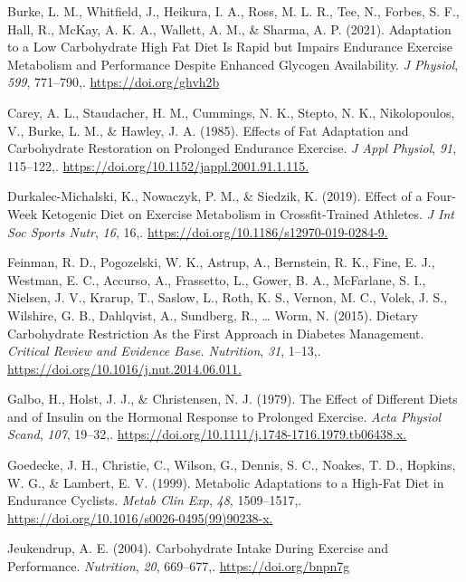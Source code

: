 \documentclass[]{cik}%
\newlength{\cslhangindent}
\newlength{\cslentryspacingunit} %
\newenvironment{CSLReferences}[2] %
 {%
  \setlength{\parindent}{0pt}
  \ifodd #1
  \let\oldpar\par
  \def\par{\hangindent=\cslhangindent\oldpar}
  \fi
  \setlength{\parskip}{#2\cslentryspacingunit}
 }%
 {}
\begin{document}
\begin{CSLReferences}{1}{0}
\leavevmode{}%
Burke, L. M., Whitfield, J., Heikura, I. A., Ross, M. L. R., Tee, N.,
Forbes, S. F., Hall, R., McKay, A. K. A., Wallett, A. M., \& Sharma, A.
P. (2021). Adaptation to a Low Carbohydrate High Fat Diet Is Rapid but
Impairs Endurance Exercise Metabolism and Performance Despite Enhanced
Glycogen Availability. \emph{J Physiol}, \emph{599}, 771--790,.
\url{https://doi.org/ghvh2b}

\leavevmode{}%
Carey, A. L., Staudacher, H. M., Cummings, N. K., Stepto, N. K.,
Nikolopoulos, V., Burke, L. M., \& Hawley, J. A. (1985). Effects of Fat
Adaptation and Carbohydrate Restoration on Prolonged Endurance Exercise.
\emph{J Appl Physiol}, \emph{91}, 115--122,.
\url{https://doi.org/10.1152/jappl.2001.91.1.115.}

\leavevmode{}%
Durkalec-Michalski, K., Nowaczyk, P. M., \& Siedzik, K. (2019). Effect
of a Four-Week Ketogenic Diet on Exercise Metabolism in Crossfit-Trained
Athletes. \emph{J Int Soc Sports Nutr}, \emph{16}, 16,.
\url{https://doi.org/10.1186/s12970-019-0284-9.}

\leavevmode{}%
Feinman, R. D., Pogozelski, W. K., Astrup, A., Bernstein, R. K., Fine,
E. J., Westman, E. C., Accurso, A., Frassetto, L., Gower, B. A.,
McFarlane, S. I., Nielsen, J. V., Krarup, T., Saslow, L., Roth, K. S.,
Vernon, M. C., Volek, J. S., Wilshire, G. B., Dahlqvist, A., Sundberg,
R., \ldots{} Worm, N. (2015). Dietary Carbohydrate Restriction As the
First Approach in Diabetes Management. \emph{Critical Review and
Evidence Base. Nutrition}, \emph{31}, 1--13,.
\url{https://doi.org/10.1016/j.nut.2014.06.011.}

\leavevmode{}%
Galbo, H., Holst, J. J., \& Christensen, N. J. (1979). The Effect of
Different Diets and of Insulin on the Hormonal Response to Prolonged
Exercise. \emph{Acta Physiol Scand}, \emph{107}, 19--32,.
\url{https://doi.org/10.1111/j.1748-1716.1979.tb06438.x.}

\leavevmode{}%
Goedecke, J. H., Christie, C., Wilson, G., Dennis, S. C., Noakes, T. D.,
Hopkins, W. G., \& Lambert, E. V. (1999). Metabolic Adaptations to a
High-Fat Diet in Endurance Cyclists. \emph{Metab Clin Exp}, \emph{48},
1509--1517,. \url{https://doi.org/10.1016/s0026-0495(99)90238-x.}

\leavevmode{}%
Jeukendrup, A. E. (2004). Carbohydrate Intake During Exercise and
Performance. \emph{Nutrition}, \emph{20}, 669--677,.
\url{https://doi.org/bnpn7g}


\end{CSLReferences}
\end{document}
